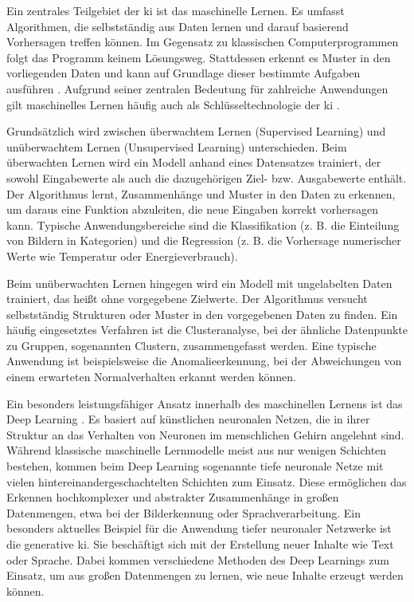 Ein zentrales Teilgebiet der \acs{ki} ist das maschinelle Lernen.
Es umfasst Algorithmen, die selbstständig aus Daten lernen und darauf basierend Vorhersagen treffen können.
Im Gegensatz zu klassischen Computerprogrammen folgt das Programm keinem Lösungsweg. 
Stattdessen erkennt es Muster in den vorliegenden Daten und kann auf Grundlage dieser bestimmte Aufgaben ausführen \cite{MLDefinition}.
Aufgrund seiner zentralen Bedeutung für zahlreiche Anwendungen gilt maschinelles Lernen häufig auch als Schlüsseltechnologie der \acs{ki} \cite{MLSchlüsseltechnologie}. 

Grundsätzlich wird zwischen überwachtem Lernen (Supervised Learning) und unüberwachtem Lernen (Unsupervised Learning) unterschieden.
Beim überwachten Lernen wird ein Modell anhand eines Datensatzes trainiert, der sowohl Eingabewerte als auch die dazugehörigen Ziel- bzw. Ausgabewerte enthält.
Der Algorithmus lernt, Zusammenhänge und Muster in den Daten zu erkennen, um daraus eine Funktion abzuleiten, die neue Eingaben korrekt vorhersagen kann.
Typische Anwendungsbereiche sind die Klassifikation (z. B. die Einteilung von Bildern in Kategorien) und die Regression (z. B. die Vorhersage numerischer Werte wie Temperatur oder Energieverbrauch).

Beim unüberwachten Lernen hingegen wird ein Modell mit ungelabelten Daten trainiert, das heißt ohne vorgegebene Zielwerte. 
Der Algorithmus versucht selbstständig Strukturen oder Muster in den vorgegebenen Daten zu finden.
Ein häufig eingesetztes Verfahren ist die Clusteranalyse, bei der ähnliche Datenpunkte zu Gruppen, sogenannten Clustern, zusammengefasst werden. 
Eine typische Anwendung ist beispielsweise die Anomalieerkennung, bei der Abweichungen von einem erwarteten Normalverhalten erkannt werden können. \cite{DLDefinition}

Ein besonders leistungsfähiger Ansatz innerhalb des maschinellen Lernens ist das Deep Learning \cite{DLEinordnung}.
Es basiert auf künstlichen neuronalen Netzen, die in ihrer Struktur an das Verhalten von Neuronen im menschlichen Gehirn angelehnt sind.
Während klassische maschinelle Lernmodelle meist aus nur wenigen Schichten bestehen, kommen beim 
\linebreak
Deep Learning sogenannte tiefe neuronale Netze mit vielen hintereinandergeschachtelten Schichten zum Einsatz.
Diese ermöglichen das Erkennen hochkomplexer und abstrakter Zusammenhänge in großen Datenmengen, etwa bei der Bilderkennung oder Sprachverarbeitung. \cite{DLDefinition}
Ein besonders aktuelles Beispiel für die Anwendung tiefer neuronaler Netzwerke ist die generative \acs{ki}. 
Sie beschäftigt sich mit der Erstellung neuer Inhalte wie Text oder Sprache. 
Dabei kommen verschiedene Methoden des Deep Learnings zum Einsatz, um aus großen Datenmengen zu lernen, wie neue Inhalte erzeugt werden können. \cite{GenerativeKI}

